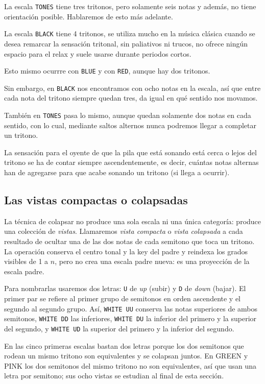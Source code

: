 \documentclass[]{report}
\begin{document}
La escala \texttt{TONES} tiene tres tritonos, pero solamente seis notas y además, no tiene orientación posible. Hablaremos de esto más adelante.

La escala \texttt{BLACK} tiene 4 tritonos, se utiliza mucho en la música clásica cuando se desea remarcar la sensación tritonal, sin paliativos ni trucos, no ofrece ningún espacio para el relax y suele usarse durante periodos cortos.

Esto mismo ocurrre con \texttt{BLUE} y con \texttt{RED}, aunque hay dos tritonos.

Sin embargo, en \texttt{BLACK} nos encontramos con ocho notas en la escala, así que entre cada nota del tritono siempre quedan tres, da igual en qué sentido nos movamos.

También en \texttt{TONES} pasa lo mismo, aunque quedan solamente dos notas en cada sentido, con lo cual, mediante saltos alternos nunca podremos llegar a completar un tritono.

La sensación para el oyente de que la pila que está sonando está cerca o lejos del tritono se ha de contar siempre ascendentemente, es decir, cuántas notas alternas han de agregarse para que acabe sonando un tritono (si llega a ocurrir).

\subsection{Las vistas compactas o colapsadas}
\label{sec:vistas-por-colapso}

La técnica de colapsar no produce una sola escala ni una única categoría:
produce una colección de \emph{vistas}. Llamaremos \emph{vista
compacta} o \emph{vista colapsada} a cada resultado de ocultar una de las dos
notas de cada semitono que toca un tritono. La operación conserva el centro
tonal y la key del padre y reindexa los grados visibles de 1 a $n$, pero no crea
una escala padre nueva: es una proyección de la escala padre.

Para nombrarlas usaremos dos letras: \texttt{U} de \emph{up} (subir) y
\texttt{D} de \emph{down} (bajar). El primer par se refiere al primer grupo de
semitonos en orden ascendente y el segundo al segundo grupo. Así, \texttt{WHITE
UU} conserva las notas superiores de ambos semitonos, \texttt{WHITE DD} las
inferiores, \texttt{WHITE DU} la inferior del primero y la superior del segundo,
y \texttt{WHITE UD} la superior del primero y la inferior del segundo.

En las cinco primeras escalas bastan dos letras porque los dos semitonos que
rodean un mismo tritono son equivalentes y se colapsan juntos. En \textsf{GREEN} y
\textsf{PINK} los dos semitonos del mismo tritono no son equivalentes, así que
usan una letra por semitono; sus ocho vistas se estudian al final de esta
sección.
\end{document}
